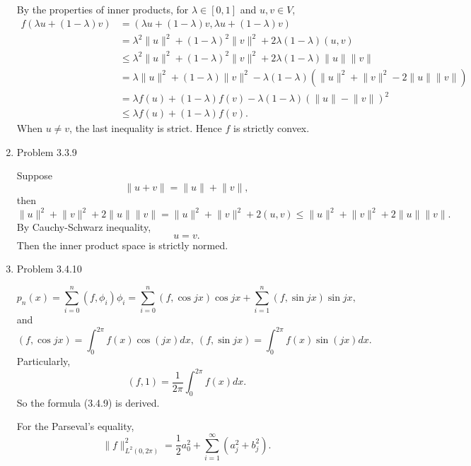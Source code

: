 \documentclass{article}%
\newcommand{\lv}{\lVert}
\newcommand{\rv}{\rVert}
\begin{document}
\begin{enumerate}
By the properties of inner products, for $\lambda \in [0, 1]$ and $u, v\in V$,
$$
\begin{aligned}
f(\lambda u+(1-\lambda)v) &= (\lambda u+(1-\lambda)v, \lambda u+(1-\lambda)v) \\
&= \lambda^2 \lVert u\rVert^2 + (1-\lambda)^2\lVert v\rVert^2 + 2\lambda(1-\lambda)(u, v) \\
&\le\lambda^2\lVert u\rVert^2+(1-\lambda)^2 \lVert v\rVert^2 + 2\lambda(1-\lambda)\lVert u\rVert\lVert v\rVert \\
&=\lambda \lVert u\rVert^2+(1-\lambda)\lVert v\rVert^2-\lambda(1-\lambda) (\lVert u\rVert^2 + \lVert v\rVert^2 - 2\lVert u\rVert \lVert v\rVert) \\
&= \lambda f(u)+(1-\lambda)f(v)-\lambda(1-\lambda)(\lVert u\rVert-\lVert v\rVert)^2\\
&\le \lambda f(u)+(1-\lambda)f(v).
\end{aligned}
$$
When $u\ne v$, the last inequality is strict. Hence $f$ is strictly convex.

\item Problem 3.3.9

Suppose 
$$
\lv u+v\rv = \lv u\rv+\lv v\rv,
$$
then
$$
\lv u\rv^2+\lv v\rv^2+2\lv u\rv\lv v\rv = \lv u\rv^2+\lv v\rv^2+2(u,v) \le \lv u\rv^2+\lv v\rv^2+2\lv u\rv\lv v\rv.
$$
By Cauchy-Schwarz inequality, 
$$
u = v.
$$
Then the inner product space is strictly normed.

\item Problem 3.4.10

$$
p_n(x) = \sum_{i=0}^{n}(f, \phi_i)\phi_i = \sum_{i=0}^n (f, \cos jx)\cos jx+\sum_{i=1}^{n}(f, \sin jx)\sin jx,
$$
and
$$
(f, \cos jx) = \int_{0}^{2\pi} f(x)\cos(jx) dx, \ (f, \sin jx) = \int_{0}^{2\pi} f(x)\sin(jx)dx.
$$
Particularly,
$$
(f, 1) = \frac{1}{2\pi}\int_0^{2\pi}f(x)dx.
$$
So the formula (3.4.9) is derived.

For the Parseval's equality, 
$$
\lv f\rv_{L^2(0, 2\pi)}^2 = \frac{1}{2}a_0^2+\sum_{i=1}^{\infty}(a_j^2+b_j^2).
$$

\end{enumerate}
\end{document}
